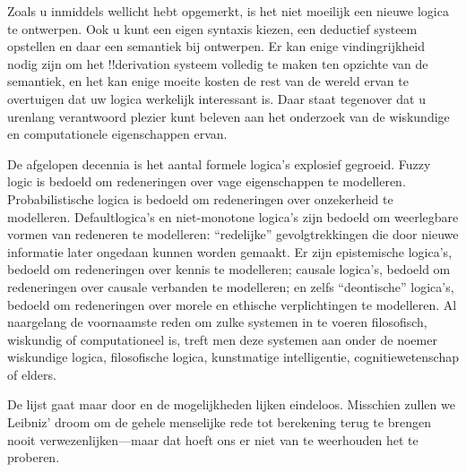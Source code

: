 \documentclass[openany]{memoir}
\begin{document}
\begingroup
\def\olfilename{OLP-0181}
\def\olfilepath{content/first-order-logic/beyond/}
\hypertarget{unit-OLP-0181}{}





Zoals u inmiddels wellicht hebt opgemerkt, is het niet moeilijk een nieuwe
logica te ontwerpen. Ook u kunt een eigen syntaxis kiezen, een deductief systeem
opstellen en daar een semantiek bij ontwerpen. Er kan enige vindingrijkheid
nodig zijn om het !!{derivation} systeem volledig te maken ten opzichte van de
semantiek, en het kan enige moeite kosten de rest van de wereld ervan te
overtuigen dat uw logica werkelijk interessant is. Daar staat tegenover dat u
urenlang verantwoord plezier kunt beleven aan het onderzoek van de wiskundige
en computationele eigenschappen ervan.

De afgelopen decennia is het aantal formele logica's explosief gegroeid. Fuzzy
logic is bedoeld om redeneringen over vage eigenschappen te modelleren.
Probabilistische logica is bedoeld om redeneringen over onzekerheid te
modelleren. Defaultlogica's en niet-monotone logica's zijn bedoeld om
weerlegbare vormen van redeneren te modelleren: ``redelijke'' gevolgtrekkingen
die door nieuwe informatie later ongedaan kunnen worden gemaakt. Er zijn
epistemische logica's, bedoeld om redeneringen over kennis te modelleren;
causale logica's, bedoeld om redeneringen over causale verbanden te modelleren;
en zelfs ``deontische'' logica's, bedoeld om redeneringen over morele en
ethische verplichtingen te modelleren. Al naargelang de voornaamste reden om
zulke systemen in te voeren filosofisch, wiskundig of computationeel is, treft
men deze systemen aan onder de noemer wiskundige logica, filosofische logica,
kunstmatige intelligentie, cognitiewetenschap of elders.

De lijst gaat maar door en de mogelijkheden lijken eindeloos. Misschien zullen
we Leibniz' droom om de gehele menselijke rede tot berekening terug te brengen
nooit verwezenlijken---maar dat hoeft ons er niet van te weerhouden het te
proberen.
\endgroup
\OLEndChapterHook
\OLEndPartHook
\end{document}
